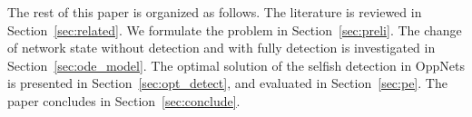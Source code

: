 The rest of this paper is organized as follows.
The literature is reviewed in Section~\ref{sec:related}.
We formulate the problem in Section~\ref{sec:preli}.
The change of network state without detection and with fully detection
is investigated in Section~\ref{sec:ode_model}.
The optimal solution of the selfish detection in OppNets
is presented in Section~\ref{sec:opt_detect},
and evaluated in Section~\ref{sec:pe}.
The paper concludes in Section~\ref{sec:conclude}.